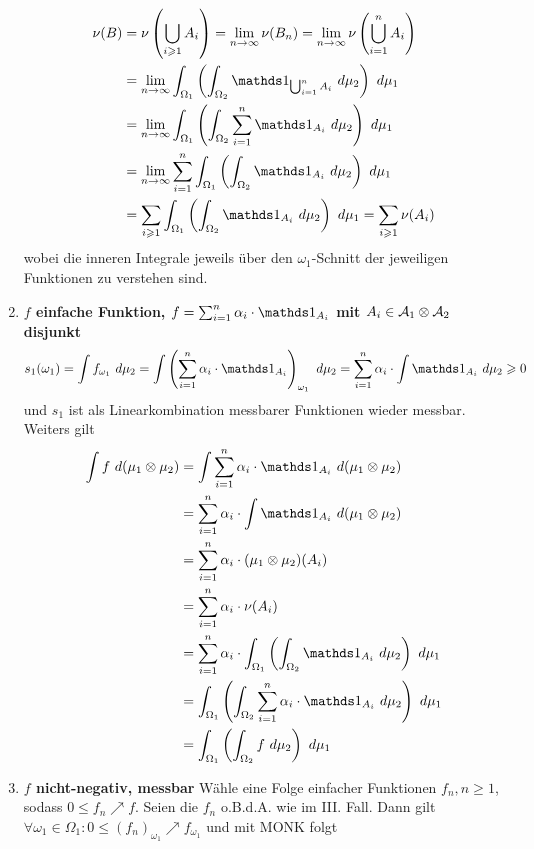 \begin{enumerate}[label=\Roman*.]
\begin{align*}
        \nu(B)&=\nu\left(\bigcup_{i\geq1}A_i\right)=\lim_{n\to\infty}\nu(B_n)=\lim_{n\to\infty}\nu\left(\bigcup_{i=1}^nA_i\right)\\
        &=\lim_{n\to\infty}\int_{\Omega_1}\left(\int_{\Omega_2}\ind{\bigcup_{i=1}^nA_i}\ d\mu_2\right)\ d\mu_1\\
        &=\lim_{n\to\infty}\int_{\Omega_1}\left(\int_{\Omega_2}\sum_{i=1}^n\ind{A_i}\ d\mu_2\right)\ d\mu_1\\
        &=\lim_{n\to\infty}\sum_{i=1}^n\int_{\Omega_1}\left(\int_{\Omega_2}\ind{A_i}\ d\mu_2\right)\ d\mu_1\\
        &=\sum_{i\geq1}\int_{\Omega_1}\left(\int_{\Omega_2}\ind{A_i}\ d\mu_2\right)\ d\mu_1=\sum_{i\geq1}\nu(A_i)
    \end{align*}
    wobei die inneren Integrale jeweils \"uber den $\omega_1$-Schnitt der jeweiligen Funktionen zu verstehen sind.
    \item \textbf{$f$ einfache Funktion, $f=\sum_{i=1}^n\alpha_i\cdot\ind{A_i}$ mit $A_i\in\mathcal{A}_1\otimes\mathcal{A}_2$ disjunkt}\newline
    $$s_1(\omega_1)=\int f_{\omega_1}\ d\mu_2=\int\left(\sum_{i=1}^n\alpha_i\cdot\ind{A_i}\right)_{\omega_1}\ d\mu_2=\sum_{i=1}^n\alpha_i\cdot\int\ind{A_i}\ d\mu_2\geq0$$
    und $s_1$ ist als Linearkombination messbarer Funktionen wieder messbar. Weiters gilt
    \begin{align*}
        \int f \ d(\mu_1\otimes\mu_2)&=\int\sum_{i=1}^n\alpha_i\cdot\ind{A_i}\ d(\mu_1\otimes\mu_2)\\
        &=\sum_{i=1}^n\alpha_i\cdot\int\ind{A_i}\ d(\mu_1\otimes\mu_2)\\
        &=\sum_{i=1}^n\alpha_i\cdot(\mu_1\otimes\mu_2)(A_i)\\
        &=\sum_{i=1}^n\alpha_i\cdot\nu(A_i)\\
        &=\sum_{i=1}^n\alpha_i\cdot\int_{\Omega_1}\left(\int_{\Omega_2}\ind{A_i}\ d\mu_2\right)\ d\mu_1\\
    &=\int_{\Omega_1}\left(\int_{\Omega_2}\sum_{i=1}^n\alpha_i\cdot\ind{A_i}\ d\mu_2\right)\ d\mu_1\\
        &=\int_{\Omega_1}\left(\int_{\Omega_2}f\ d\mu_2\right)\ d\mu_1
    \end{align*}
    \item \textbf{$f$ nicht-negativ, messbar}\newline
    W\"ahle eine Folge einfacher Funktionen $f_n,n\geq1$, sodass $0\leq f_n\nearrow f$. Seien die $f_n$ o.B.d.A. wie im III. Fall. Dann gilt $\forall\omega_1\in\Omega_1:0\leq(f_n)_{\omega_1}\nearrow f_{\omega_1}$ und mit MONK folgt

\end{enumerate}
